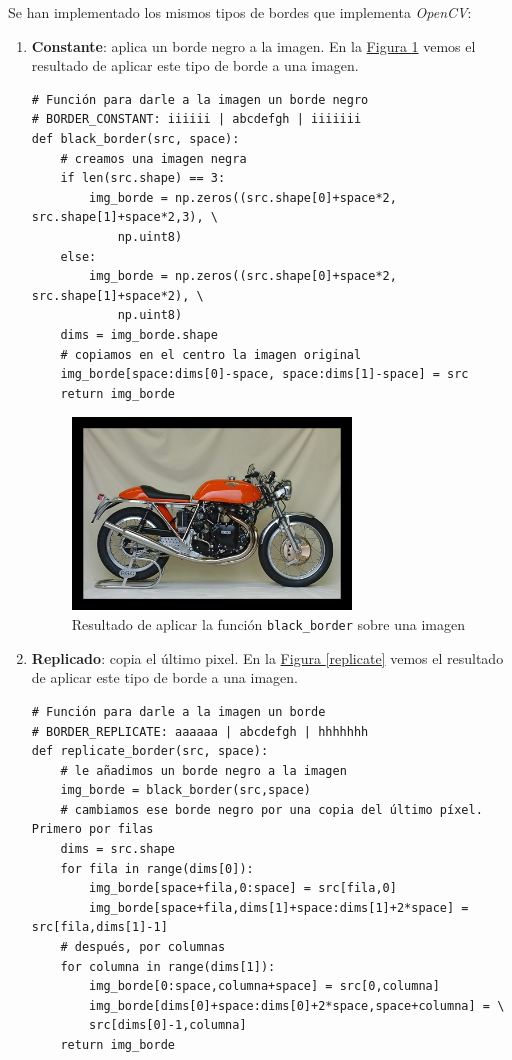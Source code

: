 \documentclass[11pt,a4paper]{article}
\theoremstyle{plain}
\theoremstyle{definition}
\begin{document}
Se han implementado los mismos tipos de bordes que implementa \textit{OpenCV}:

\begin{enumerate}[$\qquad\bullet$]
\item \textbf{Constante}: aplica un borde negro a la imagen. En la \hyperref[black]{Figura \ref*{black}} vemos el resultado de aplicar este tipo de borde a una imagen.

\begin{verbatim}
# Función para darle a la imagen un borde negro 
# BORDER_CONSTANT: iiiiii | abcdefgh | iiiiiii
def black_border(src, space):
    # creamos una imagen negra
    if len(src.shape) == 3:
        img_borde = np.zeros((src.shape[0]+space*2, src.shape[1]+space*2,3), \
            np.uint8)
    else:
        img_borde = np.zeros((src.shape[0]+space*2, src.shape[1]+space*2), \
            np.uint8)
    dims = img_borde.shape
    # copiamos en el centro la imagen original
    img_borde[space:dims[0]-space, space:dims[1]-space] = src
    return img_borde
\end{verbatim}

\begin{figure}[!h]
    \centering
    \includegraphics[width=0.7\textwidth]{borde_negro}
    \caption{Resultado de aplicar la función \texttt{black\_border} sobre una imagen}
    \label{black}
\end{figure}

\item \textbf{Replicado}: copia el último pixel. En la \hyperref[replicate]{Figura \ref*{replicate}} vemos el resultado de aplicar este tipo de borde a una imagen.

\begin{verbatim}
# Función para darle a la imagen un borde 
# BORDER_REPLICATE: aaaaaa | abcdefgh | hhhhhhh
def replicate_border(src, space):
    # le añadimos un borde negro a la imagen
    img_borde = black_border(src,space)
    # cambiamos ese borde negro por una copia del último píxel. Primero por filas
    dims = src.shape
    for fila in range(dims[0]):
        img_borde[space+fila,0:space] = src[fila,0]
        img_borde[space+fila,dims[1]+space:dims[1]+2*space] = src[fila,dims[1]-1]
    # después, por columnas
    for columna in range(dims[1]):
        img_borde[0:space,columna+space] = src[0,columna]
        img_borde[dims[0]+space:dims[0]+2*space,space+columna] = \
        src[dims[0]-1,columna]
    return img_borde
\end{verbatim}


\end{enumerate}
\end{document}

